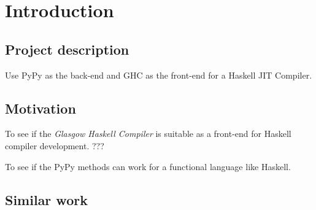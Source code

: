 

\chapter{Introduction}


\section{Project description}

Use PyPy as the back-end and GHC as the front-end for a Haskell JIT Compiler.

\section{Motivation}


To see if the \emph{Glasgow Haskell Compiler} is suitable as a front-end for
Haskell compiler development. ???

To see if the PyPy methods can work for a functional language like Haskell.


\section{Similar work}
